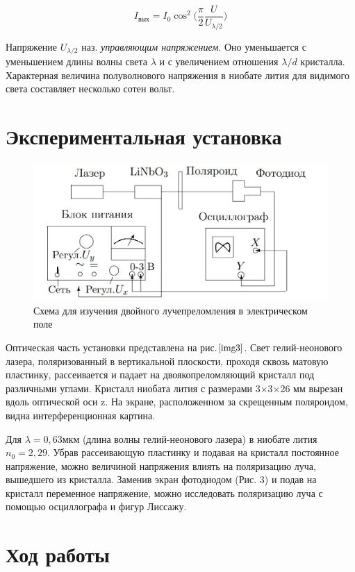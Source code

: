 \documentclass[a4paper,12pt]{article}
\begin{document}
\begin{equation}
    I_\text{вых}=I_0\cos^2{\Big(\frac{\pi}{2}\frac{U}{U_{\lambda/2}} \Big)}
\end{equation}

Напряжение $U_{\lambda/2}$ наз. \textit{управляющим напряжением}. Оно уменьшается с уменьшением длины волны света $\lambda$ и с увеличением отношения $\lambda/d$ кристалла. Характерная величина полуволнового напряжения в ниобате лития для видимого света составляет несколько сотен вольт.

\section{Экспериментальная установка}

\begin{figure}[h]
\centering
\includegraphics[width=0.8\linewidth]{img3.png}
\caption{Схема для изучения двойного лучепреломления в электрическом поле}
\label{img3}
\end{figure}

Оптическая часть установки представлена на рис.$\ref{img3}$. Свет гелий-неонового лазера, поляризованный в вертикальной плоскости, проходя сквозь матовую пластинку, рассеивается и падает на двоякопреломляющий кристалл под различными углами. Кристалл ниобата лития с размерами 3×3×26 мм вырезан вдоль оптической оси z. На экране, расположенном за скрещенным поляроидом, видна интерференционная картина.

Для $\lambda = 0,63 мкм$ (длина волны гелий-неонового лазера) в ниобате лития $n_0 = 2,29$. Убрав рассеивающую пластинку и подавая на кристалл постоянное напряжение, можно величиной напряжения влиять на поляризацию луча, вышедшего из кристалла. Заменив экран фотодиодом (Рис. 3) и подав на кристалл переменное напряжение, можно исследовать поляризацию луча с помощью осциллографа и фигур Лиссажу.

\newpage
\section{Ход работы}
\end{document}
